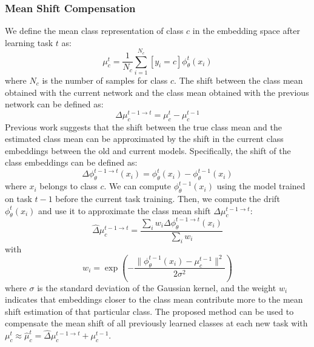 \subsubsection{Mean Shift Compensation}
We define the mean class representation of class $c$ in the embedding space after learning task $t$ as:
\begin{equation}
    \mu_c^t = \frac{1}{N_c} \sum_{i=1}^{N_c} [y_i = c] \phi_{\theta}^t(x_i)
\end{equation}
where $N_c$ is the number of samples for class $c$. The shift between the class mean obtained with the current network and the class mean obtained with the previous network can be defined as:
\begin{equation}
    \Delta \mu_c^{t-1 \rightarrow t} = \mu_c^t - \mu_c^{t-1}
\end{equation}
Previous work \cite{yu2020semantic} suggests that the shift between the true class mean and the estimated class mean can be approximated by the shift in the current class embeddings between the old and current models. Specifically, the shift of the class embeddings can be defined as:
\begin{equation}
    \Delta \phi_{\theta}^{t-1 \rightarrow t}(x_i) = \phi_{\theta}^t(x_i) - \phi_{\theta}^{t-1}(x_i)
\end{equation}
where $x_i$ belongs to class $c$. We can compute $\phi_{\theta}^{t-1}(x_i)$ using the model trained on task $t-1$ before the current task training. Then, we compute the drift $\phi_{\theta}^t(x_i)$ and use it to approximate the class mean shift $\Delta \mu_c^{t-1 \rightarrow t}$:
\begin{equation}
    \hat{\Delta} \mu_c^{t-1 \rightarrow t} = \frac{\sum_{i} w_i \Delta \phi_{\theta}^{t-1 \rightarrow t}(x_i)}{\sum_{i} w_i}
\end{equation}
with
\begin{equation}
    w_i = \exp({-\frac{\|\phi_{\theta}^{t-1}(x_i) - \mu_c^{t-1}\|^2}{2\sigma^2}})
\end{equation}
where $\sigma$ is the standard deviation of the Gaussian kernel, and the weight $w_i$ indicates that embeddings closer to the class mean contribute more to the mean shift estimation of that particular class. The proposed method can be used to compensate the mean shift of all previously learned classes at each new task with $\mu_c^t \approx \hat\mu_c^t =\hat\Delta \mu_c^{t-1 \rightarrow t} + \mu_c^{t-1}$.


